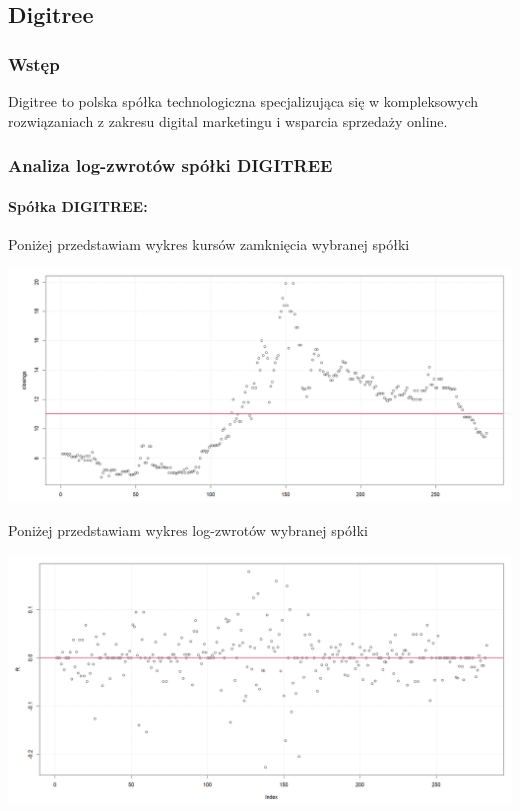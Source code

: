 \documentclass[a4paper,11pt]{article}
\begin{document}
\subsection{Digitree}

\subsubsection{Wstęp}
Digitree to polska spółka technologiczna specjalizująca się w kompleksowych rozwiązaniach z zakresu digital marketingu i wsparcia sprzedaży online.


\subsubsection{Analiza log-zwrotów spółki DIGITREE}

\paragraph{Spółka DIGITREE:}
Poniżej przedstawiam wykres kursów zamknięcia wybranej spółki

\centerline{\includegraphics[width=14cm]{./Janek/zamkniecie.png}}

Poniżej przedstawiam wykres log-zwrotów wybranej spółki

\centerline{\includegraphics[width=14cm]{./Janek/logzwroty.png}}
\end{document}
